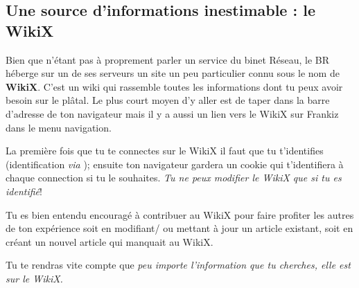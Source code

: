 
\subsection{Une source d'informations inestimable : le WikiX}
\label{WikiX}
Bien que n'\'etant pas \`a proprement parler un service du binet R\'eseau, le BR h\'eberge sur un de ses serveurs un site un peu particulier connu sous le nom de \textbf{WikiX}. C'est un wiki qui rassemble toutes les informations dont tu peux avoir besoin sur le pl\^atal. Le plus court moyen d'y aller est de taper  dans la barre d'adresse de ton navigateur mais il y a aussi un lien vers le WikiX sur Frankiz dans le menu navigation.

La premi\`ere fois que tu te connectes sur le WikiX il faut que tu t'identifies (identification \emph{via} ); ensuite ton navigateur gardera un cookie qui t'identifiera \`a chaque connection si tu le souhaites. \emph{Tu ne peux modifier le WikiX que si tu es identifi\'e}!

Tu es bien entendu encourag\'e \`a contribuer au WikiX pour faire profiter les autres de ton exp\'erience soit en modifiant/ ou mettant \`a jour un article existant, soit en cr\'eant un nouvel article qui manquait au WikiX.


Tu te rendras vite compte que \emph{peu importe l'information que tu cherches, elle est sur le WikiX.}
